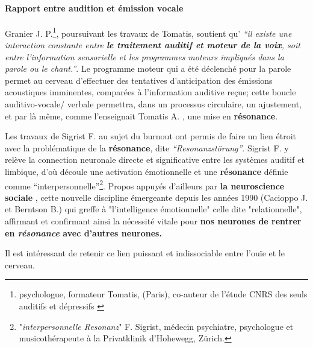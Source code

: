 \paragraph{Rapport entre audition et émission vocale}

Granier J. P.\footnote{psychologue, formateur
Tomatis, (Paris), co-auteur de l'étude CNRS des seuls auditifs et
dépressifs \autocite{affectiveDisorders} },
poursuivant les travaux de Tomatis, soutient qu'\textit{ ``il existe une
interaction
constante entre  \textbf{le traitement auditif et moteur de la
voix}, soit entre l'information sensorielle et les programmes moteurs impliqués
dans la parole ou le chant.''}.
Le programme moteur qui a été déclenché
pour la parole permet au cerveau d'effectuer des tentatives d'anticipation
des émissions acoustiques imminentes, comparées à l'information
auditive reçue; cette boucle
auditivo-vocale/ verbale permettra, dans un processus circulaire, un ajustement,
et par là même, comme l'enseignait Tomatis A. , une mise en \textbf{résonance}.


Les travaux de Sigrist F. \autocite[pp.55--90] {sigrist_burnout_2016} au sujet du burnout ont permis de faire un lien étroit avec la problématique de la
 \textbf{résonance}, dite \textit{``Resonanzstörung''}.
Sigrist F. y relève la connection neuronale
directe et significative entre les systèmes auditif et
         limbique, d'où découle une activation émotionnelle et une
         \textbf{résonance} définie comme
         ``interpersonnelle''\footnote{"\textit{interpersonnelle
             Resonanz}" F. Sigrist, médecin
psychiatre, psychologue et musicothérapeute à la Privatklinik
d'Hohewegg, Zürich.}. Propos appuyés d'ailleurs par \textbf{la neuroscience sociale} \autocite[201]{van_eersel_cerveau}, cette nouvelle discipline émergeante depuis
les années 1990 (Cacioppo J. et Berntson B.) qui greffe à "l'intelligence
émotionnelle" celle dite "relationnelle", affirmant et confirmant ainsi la nécessité vitale pour
 \textbf{nos neurones  de rentrer en \textit{résonance} avec d'autres neurones.}


Il est intéressant de retenir ce lien puissant et indissociable  entre l'ouïe et le cerveau.








